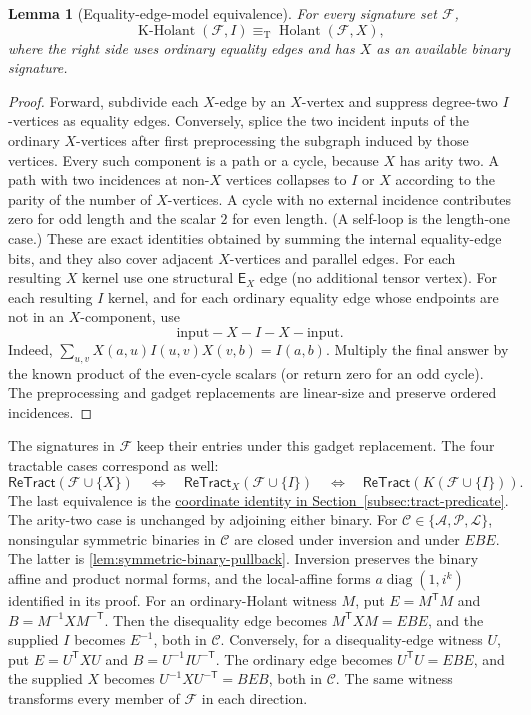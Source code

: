 \documentclass[11pt,letterpaper,onecolumn]{article}
\theoremstyle{plain}
\newtheorem{lemma}[lemma]{Lemma}
\theoremstyle{definition}
\theoremstyle{remark}
\newcommand{\cF}{\mathcal F}
\newcommand{\cA}{\mathscr A}
\newcommand{\cP}{\mathscr P}
\newcommand{\cL}{\mathscr L}
\newcommand{\cC}{\mathscr C}
\newcommand{\Holant}{\operatorname{Holant}}
\newcommand{\KHolant}{\operatorname{K\text{-}Holant}}
\newcommand{\ReTract}{\mathsf{ReTract}}
\newcommand{\diag}{\operatorname{diag}}
\newcommand{\equivT}{\equiv_{\mathrm T}}
\begin{document}
\begin{lemma}[Equality-edge-model equivalence]
\label{lem:p1-equality-wire-equivalence}
For every signature set \(\cF\),
\begin{equation}
  \KHolant(\cF,I)
  \equivT
  \Holant(\cF,X),
  \label{eq:intro-wire-bridge}
\end{equation}
where the right side uses ordinary equality edges and has \(X\) as an
available binary signature.
\end{lemma}

\begin{proof}
Forward, subdivide each \(X\)-edge by an \(X\)-vertex and suppress
degree-two \(I\)-vertices as equality edges.  Conversely, splice the two
incident inputs of the ordinary \(X\)-vertices after first preprocessing the
subgraph induced by those vertices.  Every such component is a path or a
cycle, because \(X\) has arity two.  A path with two incidences at
non-\(X\) vertices collapses to \(I\) or \(X\) according to the parity of
the number of \(X\)-vertices. A cycle with no external incidence contributes
zero for odd length and the scalar \(2\) for even length.  (A self-loop is
the length-one case.)  These are exact identities obtained by summing the
internal equality-edge bits, and they also cover adjacent \(X\)-vertices and
parallel edges.  For each resulting \(X\) kernel use one structural
\(\mathsf E_X\) edge (no additional tensor vertex). For each resulting
\(I\) kernel, and for each ordinary equality edge whose endpoints are not
in an \(X\)-component, use
\[
  \text{input}-X-I-X-\text{input}.
\]
Indeed, \(\sum_{u,v}X(a,u)I(u,v)X(v,b)=I(a,b)\).  Multiply the final
answer by the known product of the even-cycle scalars (or return zero for
an odd cycle).  The preprocessing and gadget replacements are linear-size and
preserve ordered incidences.
\end{proof}

The signatures in \(\cF\) keep their entries under this gadget replacement.
The four tractable cases correspond as well:
\hypertarget{eq:retract-edge-bridge}{}
\[
 \ReTract(\cF\cup\{X\})
 \quad\Longleftrightarrow\quad
 \ReTract_X(\cF\cup\{I\})
 \quad\Longleftrightarrow\quad
 \ReTract(K(\cF\cup\{I\})).
\]
The last equivalence is the \hyperlink{eq:retract-K-coordinates}{coordinate
identity in Section~\ref{subsec:tract-predicate}}. The arity-two case is
unchanged by adjoining either binary. For
\(\cC\in\{\cA,\cP,\cL\}\), nonsingular symmetric binaries in
\(\cC\) are closed under inversion and under \(EBE\).
The latter is \cref{lem:symmetric-binary-pullback}. Inversion preserves
the binary affine and product normal forms, and the local-affine forms
\(a\diag(1,i^k)\) identified in its proof.
For an ordinary-Holant witness \(M\), put
\(E=M^{\mathsf T}M\) and \(B=M^{-1}XM^{-\mathsf T}\).
Then the disequality edge becomes \(M^{\mathsf T}XM=EBE\), and the
supplied \(I\) becomes \(E^{-1}\), both in \(\cC\).
Conversely, for a disequality-edge witness \(U\), put
\(E=U^{\mathsf T}XU\) and \(B=U^{-1}IU^{-\mathsf T}\).
The ordinary edge becomes \(U^{\mathsf T}U=EBE\), and the supplied
\(X\) becomes \(U^{-1}XU^{-\mathsf T}=BEB\), both in \(\cC\).
The same witness transforms every member of \(\cF\) in each direction.
\end{document}
